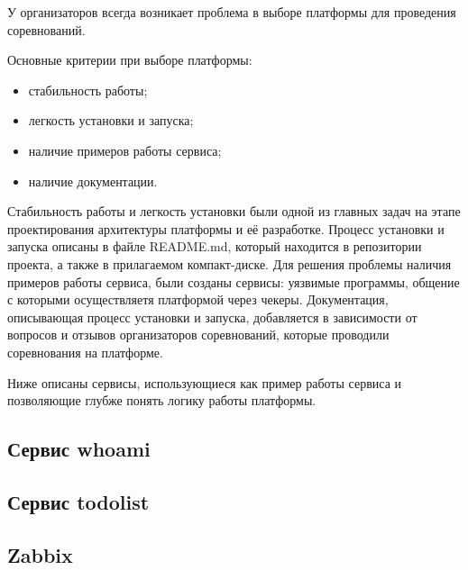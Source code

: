 У организаторов всегда возникает проблема в выборе платформы для проведения соревнований.

Основные критерии при выборе платформы:
\begin{itemize}
\item стабильность работы;
\item легкость установки и запуска;
\item наличие примеров работы сервиса;
\item наличие документации.
\end{itemize}


Стабильность работы и легкость установки были одной из главных задач на этапе проектирования архитектуры платформы и её разработке. Процесс установки и запуска описаны в файле README.md, который находится в репозитории проекта, а также в прилагаемом компакт-диске. 
Для решения проблемы наличия примеров работы сервиса, были созданы сервисы: уязвимые программы, общение с которыми осуществляетя платформой через чекеры.
Документация, описывающая процесс установки и запуска, добавляется в зависимости от вопросов и отзывов организаторов соревнований, которые проводили соревнования на платформе.

Ниже описаны сервисы, использующиеся как пример работы сервиса и позволяющие глубже понять логику работы платформы.

\subsection{Сервис whoami}


\subsection{Сервис todolist}


\subsection{Zabbix}
